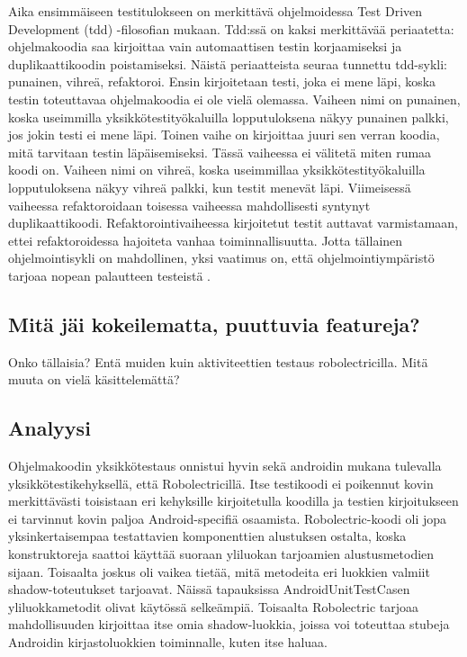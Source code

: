 Aika ensimmäiseen testitulokseen on merkittävä ohjelmoidessa Test Driven Development (tdd) -filosofian mukaan. Tdd:ssä on kaksi merkittävää periaatetta: ohjelmakoodia saa kirjoittaa vain automaattisen testin korjaamiseksi ja duplikaattikoodin poistamiseksi. Näistä periaatteista seuraa tunnettu tdd-sykli: punainen, vihreä, refaktoroi. Ensin kirjoitetaan testi, joka ei mene läpi, koska testin toteuttavaa ohjelmakoodia ei ole vielä olemassa. Vaiheen nimi on punainen, koska useimmilla yksikkötestityökaluilla lopputuloksena näkyy punainen palkki, jos jokin testi ei mene läpi. Toinen vaihe on kirjoittaa juuri sen verran koodia, mitä tarvitaan testin läpäisemiseksi. Tässä vaiheessa ei välitetä miten rumaa koodi on. Vaiheen nimi on vihreä, koska useimmillaa yksikkötestityökaluilla lopputuloksena näkyy vihreä palkki, kun testit menevät läpi. Viimeisessä vaiheessa refaktoroidaan toisessa vaiheessa mahdollisesti syntynyt duplikaattikoodi. Refaktorointivaiheessa kirjoitetut testit auttavat varmistamaan, ettei refaktoroidessa hajoiteta vanhaa toiminnallisuutta. Jotta tällainen ohjelmointisykli on mahdollinen, yksi vaatimus on, että ohjelmointiympäristö tarjoaa nopean palautteen testeistä \cite{tdd}.

\subsection{Mitä jäi kokeilematta, puuttuvia featureja?}

Onko tällaisia? Entä muiden kuin aktiviteettien testaus robolectricilla. Mitä muuta on vielä käsittelemättä?

\subsection{Analyysi}

Ohjelmakoodin yksikkötestaus onnistui hyvin sekä androidin mukana tulevalla yksikkötestikehyksellä, että Robolectricillä. Itse testikoodi ei poikennut kovin merkittävästi toisistaan eri kehyksille kirjoitetulla koodilla ja testien kirjoitukseen ei tarvinnut kovin paljoa Android-specifiä osaamista. Robolectric-koodi oli jopa yksinkertaisempaa testattavien komponenttien alustuksen ostalta, koska konstruktoreja saattoi käyttää suoraan yliluokan tarjoamien alustusmetodien sijaan. Toisaalta joskus oli vaikea tietää, mitä metodeita eri luokkien valmiit shadow-toteutukset tarjoavat. Näissä tapauksissa AndroidUnitTestCasen yliluokkametodit olivat käytössä selkeämpiä. Toisaalta Robolectric tarjoaa mahdollisuuden kirjoittaa itse omia shadow-luokkia, joissa voi toteuttaa stubeja Androidin kirjastoluokkien toiminnalle, kuten itse haluaa.

